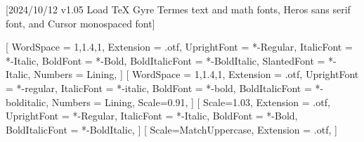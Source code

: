 
[2024/10/12 v1.05 Load TeX Gyre Termes text and math fonts, Heros sans serif font, and Cursor monospaced font]

%
%
\ifpdftex
	\RequirePackage[T1]{fontenc}	
	\RequirePackage{bm}
\else
    \RequirePackage[warnings-off={mathtools-colon,mathtools-overbracket}]{unicode-math}
    \setmainfont{TeXGyreTermesX}[%
		WordSpace = {1,1.4,1},
    	Extension = .otf,
    	UprightFont = *-Regular,
    	ItalicFont = *-Italic,
    	BoldFont = *-Bold,
    	BoldItalicFont = *-BoldItalic,
		SlantedFont = *-Italic,
		Numbers = Lining,
	]
    \setsansfont{texgyreheros}[%
		WordSpace = {1,1.4,1},
		Extension = .otf,
    	UprightFont = *-regular,
    	ItalicFont = *-italic,
    	BoldFont = *-bold,
    	BoldItalicFont = *-bolditalic,
		Numbers = Lining,
    	Scale=0.91,%
	]        
   \setmonofont{texgyrecursor}[%
        Scale=1.03, %
        Extension = .otf,
        UprightFont = *-Regular,
        ItalicFont = *-Italic,
        BoldFont = *-Bold, 
    	BoldItalicFont = *-BoldItalic,
    ]             
    [%
    	Scale=MatchUppercase,
    	Extension = .otf,
    ]
    \newcommand*{\FRAC}[1]{{\addfontfeature{Fractions=On}#1}}%
\fi
